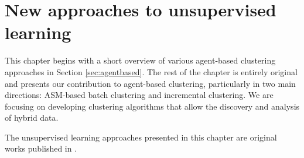 
\chapter{New approaches to unsupervised learning}
\label{chap:asmclustering}

This chapter begins with a short overview of various agent-based clustering approaches in Section \ref{sec:agentbased}. The rest of the chapter is entirely original and presents our contribution to agent-based clustering, particularly in two main directions: ASM-based batch clustering and incremental clustering. We are focusing on developing clustering algorithms that allow the discovery and analysis of hybrid data.

The unsupervised learning approaches presented in this chapter are original works published in \cite{Gaceanu10AnAdaptive,  Gaceanu11AContext, Gaceanu11AFuzzy, Gaceanu11ABio, Gaceanu11AnIncremental}. 

